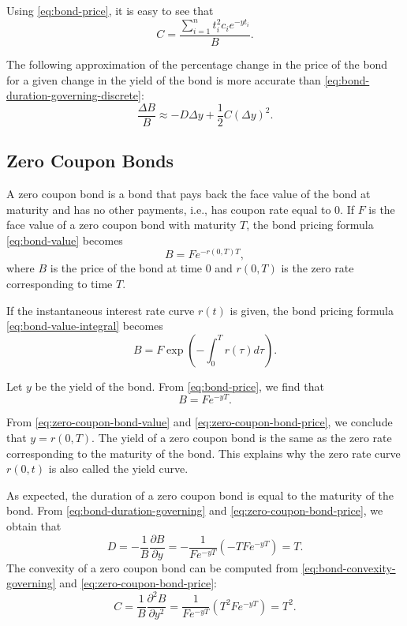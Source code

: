 Using \eqref{eq:bond-price}, it is easy to see that
\begin{equation*}
    C = \frac{\sum_{i=1}^{n} t_i^2 c_i e^{-yt_i}}{B}.
\end{equation*}

The following approximation of the percentage change in the price of the bond
    for a given change in the yield of the bond is more accurate than
    \eqref{eq:bond-duration-governing-discrete}:
\begin{equation*}
    \frac{\Delta B}{B} \approx -D \Delta y + \frac{1}{2} C (\Delta y)^2.
\end{equation*}

\subsection{Zero Coupon Bonds}
A zero coupon bond is a bond that pays back the face value of the bond at
    maturity and has no other payments, i.e., has coupon rate equal to 0.
If $ F $ is the face value of a zero coupon bond with maturity $ T $, the bond
    pricing formula \eqref{eq:bond-value} becomes
\begin{equation}
    B = F e^{-r(0, T)T},
    \label{eq:zero-coupon-bond-value}
\end{equation}
where $ B $ is the price of the bond at time 0 and $ r(0, T) $ is the zero rate
    corresponding to time $ T $.

If the instantaneous interest rate curve $ r(t) $ is given, the bond pricing
    formula \eqref{eq:bond-value-integral} becomes
\begin{equation}
    B = F \exp \left( -\int_{0}^{T} r(\tau) d\tau \right).
\end{equation}

Let $ y $ be the yield of the bond.
From \eqref{eq:bond-price}, we find that
\begin{equation}
    B = F e^{-y T}.
    \label{eq:zero-coupon-bond-price}
\end{equation}

From \eqref{eq:zero-coupon-bond-value} and \eqref{eq:zero-coupon-bond-price},
    we conclude that $ y = r(0, T) $.
The yield of a zero coupon bond is the same as the zero rate corresponding to
    the maturity of the bond.
This explains why the zero rate curve $ r(0, t) $ is also called the yield
    curve.

As expected, the duration of a zero coupon bond is equal to the maturity of the
    bond.
From \eqref{eq:bond-duration-governing} and \eqref{eq:zero-coupon-bond-price},
    we obtain that
\begin{equation*}
    D = -\frac{1}{B} \frac{\partial B}{\partial y} =
        -\frac{1}{F e^{-yT}} (-T F e^{-yT}) = T.
\end{equation*}
The convexity of a zero coupon bond can be computed from
    \eqref{eq:bond-convexity-governing} and \eqref{eq:zero-coupon-bond-price}:
\begin{equation*}
    C = \frac{1}{B} \frac{\partial^2 B}{\partial y^2} =
        \frac{1}{F e^{-yT}} (T^2 F e^{-yT}) = T^2.
\end{equation*}

